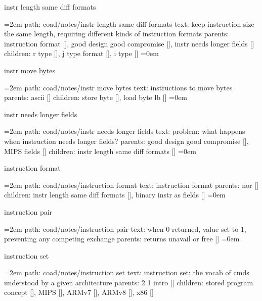 instr length same diff formats
\smallskip
\par\begingroup
\leftskip=2em
path: coad/notes/instr length same diff formats
\smallskip
text:  keep instruction size the same length, requiring different kinds of instruction formats
\smallskip
parents:  instruction format [], good design good compromise [], instr needs longer fields []
\smallskip
children: r type [], j type format [], i type []
\smallskip
\leftskip=0em
\par\endgroup
\bigskip
{}
instr move bytes
\smallskip
\par\begingroup
\leftskip=2em
path: coad/notes/instr move bytes
\smallskip
text:  instructions to move bytes
\smallskip
parents:  ascii []
\smallskip
children: store byte [], load byte lb []
\smallskip
\leftskip=0em
\par\endgroup
\bigskip
{}
instr needs longer fields
\smallskip
\par\begingroup
\leftskip=2em
path: coad/notes/instr needs longer fields
\smallskip
text:  problem: what happens when instruction needs longer fields?
\smallskip
parents:  good design good compromise [], MIPS fields []
\smallskip
children: instr length same diff formats []
\smallskip
\leftskip=0em
\par\endgroup
\bigskip
{}
instruction format
\smallskip
\par\begingroup
\leftskip=2em
path: coad/notes/instruction format
\smallskip
text:  instruction format
\smallskip
parents:  nor []
\smallskip
children: instr length same diff formats [], binary instr as fields []
\smallskip
\leftskip=0em
\par\endgroup
\bigskip
{}
instruction pair
\smallskip
\par\begingroup
\leftskip=2em
path: coad/notes/instruction pair
\smallskip
text:  when 0 returned, value set to 1, preventing any competing exchange
\smallskip
parents:  returns unavail or free []
\smallskip
\leftskip=0em
\par\endgroup
\bigskip
{}
instruction set
\smallskip
\par\begingroup
\leftskip=2em
path: coad/notes/instruction set
\smallskip
text:  instruction set: the vocab of cmds understood by a given architecture
\smallskip
parents:  2 1 intro []
\smallskip
children: stored program concept [], MIPS [], ARMv7 [], ARMv8 [], x86 []
